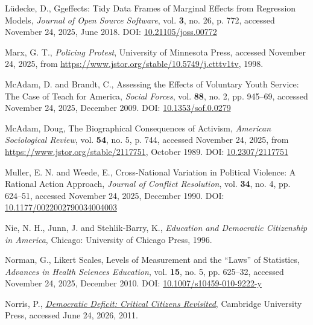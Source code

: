 \documentclass[
  13pt,
]{article}
\newlength{\cslhangindent}
\newenvironment{CSLReferences}[2] %
 {\begin{list}{}{%
  \setlength{\itemindent}{0pt}
  \setlength{\leftmargin}{0pt}
  \setlength{\parsep}{0pt}
  \ifodd #1
   \setlength{\leftmargin}{\cslhangindent}
   \setlength{\itemindent}{-1\cslhangindent}
  \fi
  \setlength{\itemsep}{#2\baselineskip}}}
 {\end{list}}
\begin{document}
\begin{CSLReferences}{1}{0}
Lüdecke, D., Ggeffects: {Tidy Data Frames} of {Marginal Effects} from
{Regression Models}, \emph{Journal of Open Source Software}, vol.
\textbf{3}, no. 26, p. 772, accessed November 24, 2025, June 2018. DOI:
\href{https://doi.org/10.21105/joss.00772}{10.21105/joss.00772}

Marx, G. T., \emph{Policing {Protest}}, University of Minnesota Press,
accessed November 24, 2025, from
\url{https://www.jstor.org/stable/10.5749/j.ctttv1tv}, 1998.

McAdam, D. and Brandt, C., Assessing the {Effects} of {Voluntary Youth
Service}: {The Case} of {Teach} for {America}, \emph{Social Forces},
vol. \textbf{88}, no. 2, pp. 945--69, accessed November 24, 2025,
December 2009. DOI:
\href{https://doi.org/10.1353/sof.0.0279}{10.1353/sof.0.0279}

McAdam, Doug, The {Biographical Consequences} of {Activism},
\emph{American Sociological Review}, vol. \textbf{54}, no. 5, p. 744,
accessed November 24, 2025, from
\url{https://www.jstor.org/stable/2117751}, October 1989. DOI:
\href{https://doi.org/10.2307/2117751}{10.2307/2117751}

Muller, E. N. and Weede, E., Cross-{National Variation} in {Political
Violence}: {A Rational Action Approach}, \emph{Journal of Conflict
Resolution}, vol. \textbf{34}, no. 4, pp. 624--51, accessed November 24,
2025, December 1990. DOI:
\href{https://doi.org/10.1177/0022002790034004003}{10.1177/0022002790034004003}

Nie, N. H., Junn, J. and Stehlik-Barry, K., \emph{Education and
Democratic Citizenship in {America}}, Chicago: University of Chicago
Press, 1996.

Norman, G., Likert Scales, Levels of Measurement and the {``Laws''} of
Statistics, \emph{Advances in Health Sciences Education}, vol.
\textbf{15}, no. 5, pp. 625--32, accessed November 24, 2025, December
2010. DOI:
\href{https://doi.org/10.1007/s10459-010-9222-y}{10.1007/s10459-010-9222-y}

Norris, P.,
\emph{\href{https://doi.org/10.1017/CBO9780511973383}{Democratic
{Deficit}: {Critical Citizens Revisited}}}, Cambridge University Press,
accessed June 24, 2026, 2011.


\end{CSLReferences}
\end{document}
